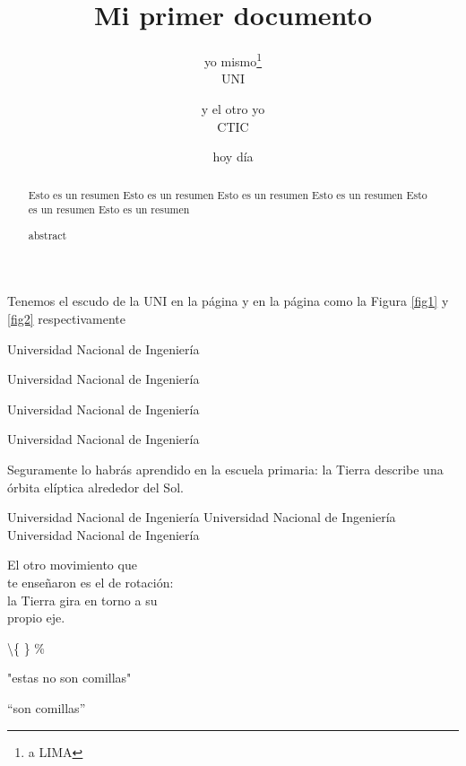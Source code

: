 \documentclass[12pt,a4paper]{article}
\title{Mi primer documento}
\author{yo mismo\thanks{a LIMA}\\UNI \and y el otro yo\\CTIC}
\date{hoy día}
\begin{document}
\maketitle

\begin{abstract}
 Esto es un resumen Esto es un resumen Esto es un resumen Esto es un resumen Esto es un resumen Esto es un resumen
\end{abstract}

\renewcommand{\spanishabstractname}{Abstract}

\begin{abstract}
	abstract
\end{abstract}

Tenemos el escudo de la UNI en la página \pageref{fig1} y en la página \pageref{fig2} como la Figura \ref{fig1} y \ref{fig2} respectivamente
	
\thispagestyle{empty}

Universidad Nacional de Ingeniería	
\begin{center}
	Universidad Nacional de Ingeniería
\end{center}	

\centerline{Universidad Nacional de Ingeniería}
Universidad Nacional de Ingeniería
	
	
\noindent Seguramente         lo habrás aprendido en la escuela primaria: la Tierra describe una órbita elíptica alrededor del Sol.\\[2cm]

\begin{flushright}
	Universidad Nacional de Ingeniería Universidad Nacional de Ingeniería Universidad Nacional de Ingeniería
\end{flushright}

\begin{flushright}
	El otro movimiento que\\ te enseñaron es el de rotación:\\ la Tierra gira en torno a su\\ propio eje.
\end{flushright}


\textbackslash  \{ \} \%

"estas no son comillas"

``son comillas''


\renewcommand{\spanishcontentsname}{Contenido de mi documento}

\tableofcontents

\listoffigures

\renewcommand{\spanishlisttablename}{Mis tablas}
\listoftables
\end{document}
